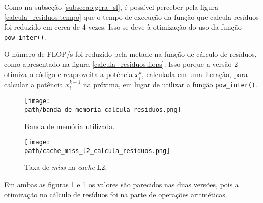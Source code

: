\documentclass[a4paper, 11pt]{article}
\begin{document}
Como na subseção \ref{subsecao:gera_sl}, é possível perceber pela figura
\ref{calcula_residuos:tempo} que o tempo de execução da função que calcula
resíduos foi reduzido em cerca de 4 vezes. Isso se deve à otimização do uso
da função \texttt{pow\_inter()}.

O número de FLOP/s foi reduzido pela metade na função de cálculo de resíduos,
como apresentado na figura \ref{calcula_residuos:flops}. Isso porque a versão
2 otimiza o código e reaproveita a potência $x_i^k$, calculada em uma iteração,
para calcular a potência $x_i^{k+1}$ na próxima, em lugar de utilizar a função
\texttt{pow\_inter()}.

\begin{figure}[H]
    \centering
    \begin{minipage}{.5\textwidth}
        \centering
        \texttt{[image: \\path/banda\_de\_memoria\_calcula\_residuos.png]}
        \caption{Banda de memória utilizada.}
        \label{calcula_residuos:banda}
    \end{minipage}\hfill
    \begin{minipage}{.5\textwidth}
        \centering
        \texttt{[image: \\path/cache\_miss\_l2\_calcula\_residuos.png]}
        \caption{Taxa de \textit{miss} na \textit{cache} L2.}
        \label{calcula_residuos:cache_miss}
    \end{minipage}
\end{figure}

Em ambas as figuras \ref{calcula_residuos:cache_miss} e
\ref{calcula_residuos:cache_miss} os valores são parecidos nas duas versões,
pois a otimização no cálculo de resíduos foi na parte de operações
aritméticas.
\end{document}
